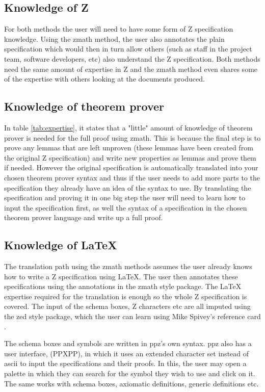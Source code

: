 \subsection{Knowledge of Z}
For both methods the user will need to have some form of Z specification knowledge. Using the \gls{zmath} method, the user also annotates the plain specification which would then in turn allow others (such as staff in the project team, software developers, etc) also understand the Z specification. Both methods need the same amount of expertise in Z and the \gls{zmath} method even shares some of the expertise with others looking at the documents produced.

\subsection{Knowledge of theorem prover}
In table \ref{tab:expertise}, it states that a "little" amount of knowledge of theorem prover is needed for the full proof using \gls{zmath}. This is because the final step is to prove any lemmas that are left unproven (these lemmas have been created from the original Z specification) and write new properties as lemmas and prove them if needed. However the original specification is automatically translated into your chosen theorem prover syntax and thus if the user needs to add more parts to the specification they already have an idea of the syntax to use. By translating the specification and proving it in one big step the user will need to learn how to input the specification first, as well the syntax of a specification in the chosen theorem prover language and write up a full proof. 

\subsection{Knowledge of \LaTeX}
The translation path using the \gls{zmath} methods assumes the user already knows how to write a Z specification using \LaTeX{}. The user then annotates these specifications using the annotations in the \gls{zmath} style package. The \LaTeX{} expertise required for the translation is enough so the whole Z specification is covered. The input of the schema boxes, Z characters etc are all imputed using the zed style package, which the user can learn using Mike Spivey's reference card \cite{zrefcard}.

The schema boxes and symbols are written in \gls{ppz}'s own syntax. \gls{ppz} also has a user interface, (PPXPP), in which it uses an extended character set instead of ascii to input the specifications and their proofs. In this, the user may open a palette in which they can search for the symbol they wish to use and click on it. The same works with schema boxes, axiomatic definitions, generic definitions etc. 

